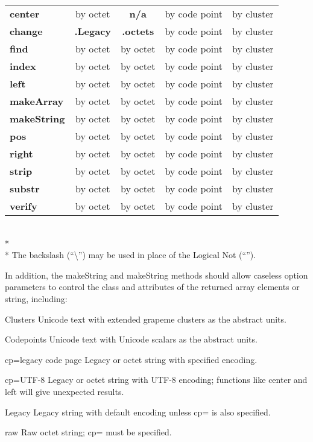 \documentclass[b4paper]{article}
\begin{document}
\begin{tabular}{| l | c | c | c | c |}
\textbf{center}      & by octet         & \textbf{n/a}     & by code point  & by cluster    \\
\textbf{change}      & \textbf{.Legacy} & \textbf{.octets} & by code point  & by cluster    \\
\textbf{find}        & by octet         & by octet         & by code point  & by cluster    \\
\textbf{index}       & by octet         & by octet         & by code point  & by cluster    \\
\textbf{left}        & by octet         & by octet         & by code point  & by cluster    \\
\textbf{makeArray}   & by octet         & by octet         & by code point  & by cluster    \\
\textbf{makeString}  & by octet         & by octet         & by code point  & by cluster    \\
\textbf{pos}         & by octet         & by octet         & by code point  & by cluster    \\
\textbf{right}       & by octet         & by octet         & by code point  & by cluster    \\
\textbf{strip}       & by octet         & by octet         & by code point  & by cluster    \\
\textbf{substr}      & by octet         & by octet         & by code point  & by cluster    \\
\textbf{verify}      & by octet         & by octet         & by code point  & by cluster    \\
\hline
\end{tabular}
\\*
\\*
The backslash (``\textbackslash'') may be used in place of the Logical Not (``\neg'').

In addition, the makeString and makeString methods should allow caseless option
parameters to control the class and attributes of the returned array
elements or string, including:

\begin{definition}
\item [Clusters] Unicode text with extended grapeme clusters as the abstract units.
\item [Codepoints] Unicode text with Unicode scalars as the abstract units.
\item [cp=legacy code page] Legacy or octet string with specified encoding.
\item [cp=UTF-8]
Legacy or octet string with UTF-8 encoding;
functions like center and left will give unexpected results.
\item [Legacy] Legacy string with default encoding unless cp= is also specified.
\item [raw] Raw octet string; cp= must be specified.
\end{definition}
\end{document}
